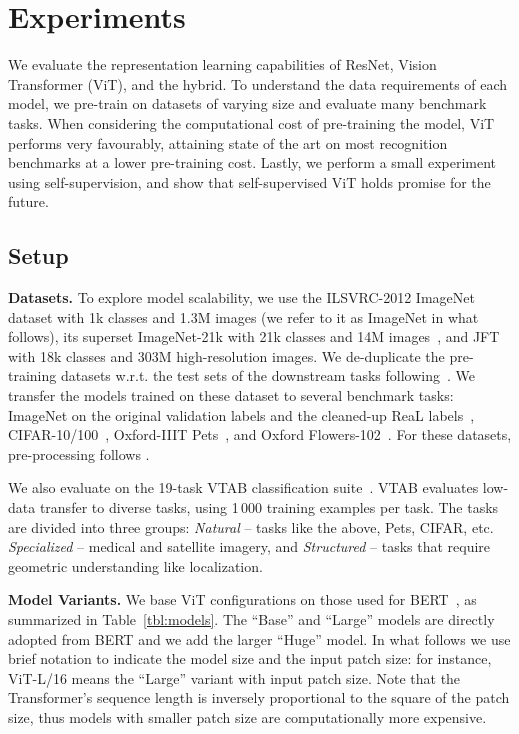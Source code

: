 \documentclass{article} \usepackage{iclr2021_conference,times}
\newcommand{\oursabbrv}{ViT\xspace}
\newcommand{\oursfull}{Vision Transformer\xspace}
\newcommand{\imagenet}{ImageNet\xspace}
\begin{document}
 \section{Experiments}
We evaluate the representation learning capabilities of ResNet, \oursfull{} (\oursabbrv{}), and the hybrid.
To understand the data requirements of each model, we pre-train on datasets of varying size and evaluate many benchmark tasks.
When considering the computational cost of pre-training the model, \oursabbrv{} performs very favourably, attaining state of the art on most recognition benchmarks at a lower pre-training cost.
Lastly, we perform a small experiment using self-supervision, and show that self-supervised \oursabbrv{} holds promise for the future.

\subsection{Setup}

\textbf{Datasets.}
To explore model scalability, we use the ILSVRC-2012 ImageNet dataset with 1k classes and 1.3M images (we refer to it as \imagenet in what follows),
its superset ImageNet-21k with 21k classes and 14M images~\citep{deng2009-imagenet},
and JFT~\citep{sun2017-jft} with  18k classes and 303M high-resolution images.
We de-duplicate the pre-training datasets w.r.t. the test sets of the downstream tasks following~\citet{kolesnikov2020-bit}.
We transfer the models trained on these dataset to several benchmark tasks:
\imagenet on the original validation labels and the cleaned-up ReaL labels~\citep{beyer2020-imagenet},
CIFAR-10/100~\citep{Krizhevsky2009-cifar}, 
Oxford-IIIT Pets~\citep{parkhi2012-pets}, 
and  Oxford Flowers-102~\citep{Nilsback2008-flowers}.
For these datasets, pre-processing follows \citet{kolesnikov2020-bit}.

We also evaluate on the 19-task VTAB classification suite~\citep{vtab}.
VTAB evaluates low-data transfer to diverse tasks, using 1\,000 training examples per task.
The tasks are divided into three groups: 
\textit{Natural} -- tasks like the above, Pets, CIFAR, etc.
\textit{Specialized} -- medical and satellite imagery, and
\textit{Structured} -- tasks that require geometric understanding like localization.

\textbf{Model Variants.}
We base \oursabbrv{} configurations on those used for BERT~\citep{devlin19-bert}, as summarized in Table~\ref{tbl:models}. 
The ``Base'' and ``Large'' models are directly adopted from BERT and we add the larger ``Huge'' model.
In what follows we use brief notation to indicate the model size and the input patch size: for instance, \oursabbrv{}-L/16 means the ``Large'' variant with  input patch size.
Note that the Transformer's sequence length is inversely proportional to the square of the patch size, thus models with smaller patch size are computationally more expensive.
\end{document}
